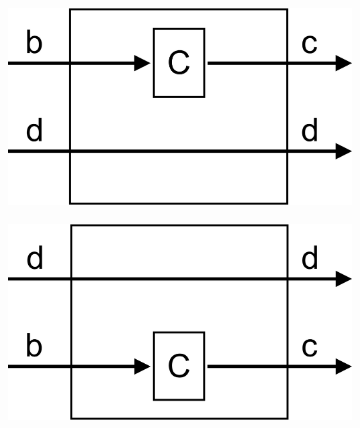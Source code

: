 \begin{figure}[H]
	\centering
	\begin{subfigure}[b]{0.35\linewidth}
		\includegraphics[width=\linewidth]{figures/API-first-operator.png}
		\caption{}
		\label{fig:first-operator}
	\end{subfigure}
	\begin{subfigure}[b]{0.35\linewidth}
		\includegraphics[width=\linewidth]{figures/API-second-operator.png}
		\caption{}
		\label{fig:second-operator}
	\end{subfigure}
	

\end{figure}
